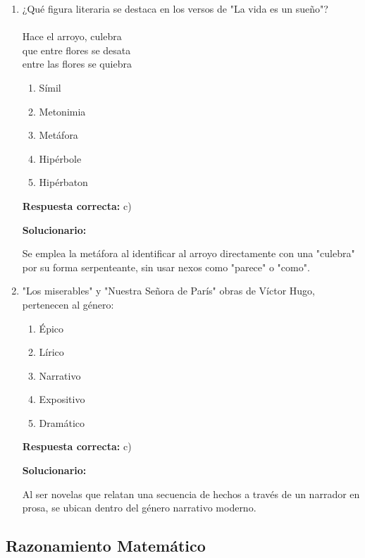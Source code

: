 \begin{enumerate}[resume]
	\item ¿Qué figura literaria se destaca en los versos de "La vida es un sueño"?\\
	\\
	Hace el arroyo, culebra\\
	que entre flores se desata\\
	entre las flores se quiebra
	\begin{enumerate}[label=\alph*)]
		\item Símil
		\item Metonimia
		\item Metáfora
		\item Hipérbole
		\item Hipérbaton
	\end{enumerate}
	\textbf{Respuesta correcta:} c)

	\vspace{2mm}
	\textbf{Solucionario:}

	Se emplea la metáfora al identificar al arroyo directamente con una "culebra" por su forma serpenteante, sin usar nexos como "parece" o "como".

	\vspace{6mm}

	\item "Los miserables" y "Nuestra Señora de París" obras de Víctor Hugo, pertenecen al género:
	\begin{enumerate}[label=\alph*)]
		\item Épico
		\item Lírico
		\item Narrativo
		\item Expositivo
		\item Dramático
	\end{enumerate}
	\textbf{Respuesta correcta:} c)

	\vspace{2mm}
	\textbf{Solucionario:}

	Al ser novelas que relatan una secuencia de hechos a través de un narrador en prosa, se ubican dentro del género narrativo moderno.

	\vspace{6mm}
\end{enumerate}











\subsection*{Razonamiento Matemático}

